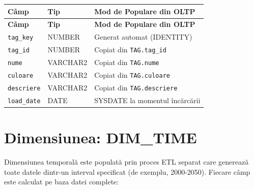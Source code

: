 \begin{longtable}{|>{\raggedright\arraybackslash}p{3.5cm}|>{\raggedright\arraybackslash}p{2.8cm}|>{\raggedright\arraybackslash}p{8.7cm}|}
\hline
\textbf{Câmp} & \textbf{Tip} & \textbf{Mod de Populare din OLTP} \\
\hline
\endfirsthead
\hline
\textbf{Câmp} & \textbf{Tip} & \textbf{Mod de Populare din OLTP} \\
\hline
\endhead
\hline
\endfoot
\hline
\endlastfoot

\texttt{tag\_key} & NUMBER & Generat automat (IDENTITY) \\
\hline
\texttt{tag\_id} & NUMBER & Copiat din \texttt{TAG.tag\_id} \\
\hline
\texttt{nume} & VARCHAR2 & Copiat din \texttt{TAG.nume} \\
\hline
\texttt{culoare} & VARCHAR2 & Copiat din \texttt{TAG.culoare} \\
\hline
\texttt{descriere} & VARCHAR2 & Copiat din \texttt{TAG.descriere} \\
\hline
\texttt{load\_date} & DATE & SYSDATE la momentul încărcării \\
\hline
\end{longtable}

\section{Dimensiunea: DIM\_TIME}

Dimensiunea temporală este populată prin proces ETL separat care generează toate datele dintr-un interval specificat (de exemplu, 2000-2050). Fiecare câmp este calculat pe baza datei complete:

